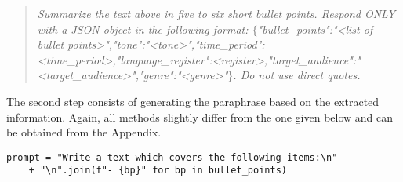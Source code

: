 \begin{quote}
    \textit{Summarize the text above in five to six short bullet points. Respond ONLY with a JSON object in the following format: $\{$"bullet\_points":"<list of bullet points>","tone":"<tone>","time\_period":<time\_period>,"language\_register":<register>,"target\_audience":"<target\_audience>","genre":"<genre>"$\}$. Do not use direct quotes.}
\end{quote}

The second step consists of generating the paraphrase based on the extracted information.
Again, all methods slightly differ from the one given below and can be obtained from the Appendix.
\begin{verbatim}
prompt = "Write a text which covers the following items:\n" 
    + "\n".join(f"- {bp}" for bp in bullet_points)
\end{verbatim}

